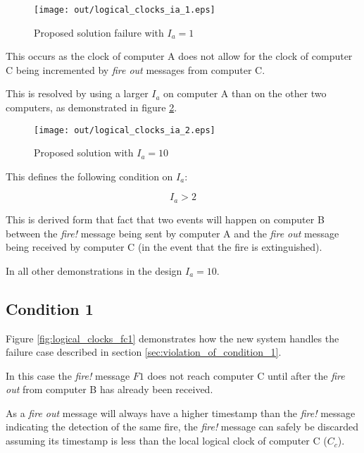 \documentclass[twocolumn]{article}
\begin{document}
\begin{figure}[h!]
  \centering
  \texttt{[image: out/logical\_clocks\_ia\_1.eps]}
  \caption{Proposed solution failure with $I_{a} = 1$}
  \label{fig:logical_clocks_ia_1}
\end{figure}

This occurs as the clock of computer A does not allow for the clock of computer
C being incremented by \textit{fire out} messages from computer C.

This is resolved by using a larger $I_{a}$ on computer A than on the other two
computers, as demonstrated in figure \ref{fig:logical_clocks_ia_2}.

\begin{figure}[h!]
  \centering
  \texttt{[image: out/logical\_clocks\_ia\_2.eps]}
  \caption{Proposed solution with $I_{a} = 10$}
  \label{fig:logical_clocks_ia_2}
\end{figure}

This defines the following condition on $I_{a}$:

\begin{equation}
  I_{a} > 2
  \label{eq:ia_condition}
\end{equation}

This is derived form that fact that two events will happen on computer B between
the \textit{fire!} message being sent by computer A and the \textit{fire out}
message being received by computer C (in the event that the fire is
extinguished).

In all other demonstrations in the design $I_{a} = 10$.

\subsection{Condition 1}

Figure \ref{fig:logical_clocks_fc1} demonstrates how the new system handles the
failure case described in section \ref{sec:violation_of_condition_1}.

In this case the \textit{fire!} message $F1$ does not reach computer C until
after the \textit{fire out} from computer B has already been received.

As a \textit{fire out} message will always have a higher timestamp than the
\textit{fire!} message indicating the detection of the same fire, the
\textit{fire!} message can safely be discarded assuming its timestamp is less
than the local logical clock of computer C ($C_{c}$).
\end{document}
